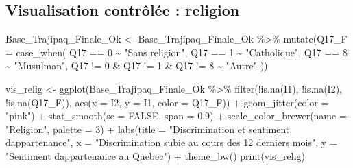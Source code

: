 \documentclass[
]{article}
\newenvironment{Shaded}{\begin{snugshade}}{\end{snugshade}}
\newcommand{\AttributeTok}[1]{\textcolor[rgb]{0.77,0.63,0.00}{#1}}
\newcommand{\ConstantTok}[1]{\textcolor[rgb]{0.00,0.00,0.00}{#1}}
\newcommand{\DecValTok}[1]{\textcolor[rgb]{0.00,0.00,0.81}{#1}}
\newcommand{\FloatTok}[1]{\textcolor[rgb]{0.00,0.00,0.81}{#1}}
\newcommand{\FunctionTok}[1]{\textcolor[rgb]{0.00,0.00,0.00}{#1}}
\newcommand{\NormalTok}[1]{#1}
\newcommand{\OtherTok}[1]{\textcolor[rgb]{0.56,0.35,0.01}{#1}}
\newcommand{\SpecialCharTok}[1]{\textcolor[rgb]{0.00,0.00,0.00}{#1}}
\newcommand{\StringTok}[1]{\textcolor[rgb]{0.31,0.60,0.02}{#1}}
\begin{document}
\hypertarget{visualisation-contruxf4luxe9e-religion}{%
\subsection{Visualisation contrôlée :
religion}\label{visualisation-contruxf4luxe9e-religion}}

\begin{Shaded}
\begin{Highlighting}[]
\NormalTok{Base\_Trajipaq\_Finale\_Ok }\OtherTok{\textless{}{-}}
\NormalTok{  Base\_Trajipaq\_Finale\_Ok }\SpecialCharTok{\%\textgreater{}\%}
  \FunctionTok{mutate}\NormalTok{(}\AttributeTok{Q17\_F =} \FunctionTok{case\_when}\NormalTok{(}
\NormalTok{    Q17 }\SpecialCharTok{==} \DecValTok{0} \SpecialCharTok{\textasciitilde{}} \StringTok{"Sans religion"}\NormalTok{,}
\NormalTok{    Q17 }\SpecialCharTok{==} \DecValTok{1} \SpecialCharTok{\textasciitilde{}} \StringTok{"Catholique"}\NormalTok{,}
\NormalTok{    Q17 }\SpecialCharTok{==} \DecValTok{8} \SpecialCharTok{\textasciitilde{}} \StringTok{"Musulman"}\NormalTok{,}
\NormalTok{    Q17 }\SpecialCharTok{!=} \DecValTok{0} \SpecialCharTok{\&}\NormalTok{ Q17 }\SpecialCharTok{!=} \DecValTok{1} \SpecialCharTok{\&}\NormalTok{ Q17 }\SpecialCharTok{!=} \DecValTok{8} \SpecialCharTok{\textasciitilde{}} \StringTok{"Autre"}
\NormalTok{  ))}
\end{Highlighting}
\end{Shaded}

\begin{Shaded}
\begin{Highlighting}[]
\NormalTok{vis\_relig }\OtherTok{\textless{}{-}} \FunctionTok{ggplot}\NormalTok{(Base\_Trajipaq\_Finale\_Ok }\SpecialCharTok{\%\textgreater{}\%}
                \FunctionTok{filter}\NormalTok{(}\SpecialCharTok{!}\FunctionTok{is.na}\NormalTok{(I1), }\SpecialCharTok{!}\FunctionTok{is.na}\NormalTok{(I2), }\SpecialCharTok{!}\FunctionTok{is.na}\NormalTok{(Q17\_F)), }\FunctionTok{aes}\NormalTok{(}\AttributeTok{x =}\NormalTok{ I2, }\AttributeTok{y =}\NormalTok{ I1, }\AttributeTok{color =}\NormalTok{ Q17\_F)) }\SpecialCharTok{+}
  \FunctionTok{geom\_jitter}\NormalTok{(}\AttributeTok{color =} \StringTok{"pink"}\NormalTok{) }\SpecialCharTok{+}
  \FunctionTok{stat\_smooth}\NormalTok{(}\AttributeTok{se =} \ConstantTok{FALSE}\NormalTok{, }\AttributeTok{span =} \FloatTok{0.9}\NormalTok{) }\SpecialCharTok{+}
  \FunctionTok{scale\_color\_brewer}\NormalTok{(}\AttributeTok{name =} \StringTok{"Religion"}\NormalTok{, }\AttributeTok{palette =} \DecValTok{3}\NormalTok{) }\SpecialCharTok{+}
  \FunctionTok{labs}\NormalTok{(}\AttributeTok{title =} \StringTok{"Discrimination et sentiment d\textquotesingle{}appartenance"}\NormalTok{, }
       \AttributeTok{x =} \StringTok{"Discrimination subie au cours des 12 derniers mois"}\NormalTok{, }
       \AttributeTok{y =} \StringTok{"Sentiment d\textquotesingle{}appartenance au Quebec"}\NormalTok{) }\SpecialCharTok{+}
  \FunctionTok{theme\_bw}\NormalTok{()}
\FunctionTok{print}\NormalTok{(vis\_relig)}
\end{Highlighting}
\end{Shaded}
\end{document}

